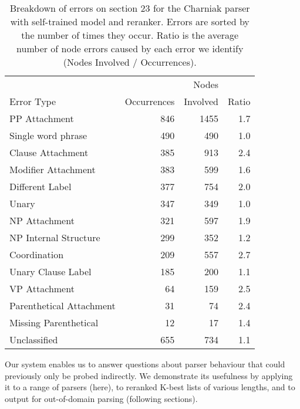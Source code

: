 \begin{table}
\small
\renewcommand{\tabcolsep}{1.7mm}
\begin{tabular}{|lrrr|}
	\hline
		                        &             & Nodes    &       \\
		Error Type\hspace{-8mm} & Occurrences & Involved & Ratio \\
	\hline
	\hline
		PP Attachment\hspace{-8mm} & 846 & 1455 & 1.7 \\
		Single word phrase\hspace{-8mm} & 490 & 490 & 1.0 \\
		Clause Attachment\hspace{-8mm} & 385 & 913 & 2.4 \\
		Modifier Attachment\hspace{-8mm} & 383 & 599 & 1.6 \\
		Different Label\hspace{-8mm} & 377 & 754 & 2.0 \\
		Unary & 347 & 349 & 1.0 \\
		NP Attachment\hspace{-8mm} & 321 & 597 & 1.9 \\
		NP Internal Structure\hspace{-8mm} & 299 & 352 & 1.2 \\
		Coordination & 209 & 557 & 2.7 \\
		Unary Clause Label\hspace{-8mm} & 185 & 200 & 1.1 \\
		VP Attachment & 64 & 159 & 2.5 \\
		Parenthetical Attachment\hspace{-8mm} & 31 & 74 & 2.4 \\
		Missing Parenthetical\hspace{-8mm} & 12 & 17 & 1.4 \\
		Unclassified & 655 & 734 & 1.1 \\
	\hline
\end{tabular}
\caption{\label{tab:charniak-breakdown}
	Breakdown of errors on section 23 for the Charniak parser with self-trained
	model and reranker.  Errors are sorted by the number of times they occur.
	Ratio is the average number of node errors caused by each error we identify
	(\myie Nodes Involved / Occurrences).
}
\end{table}

Our system enables us to answer questions about parser behaviour that could
previously only be probed indirectly.  We demonstrate its usefulness by
applying it to a range of parsers (here), to reranked K-best lists of various
lengths, and to output for out-of-domain parsing (following sections).

